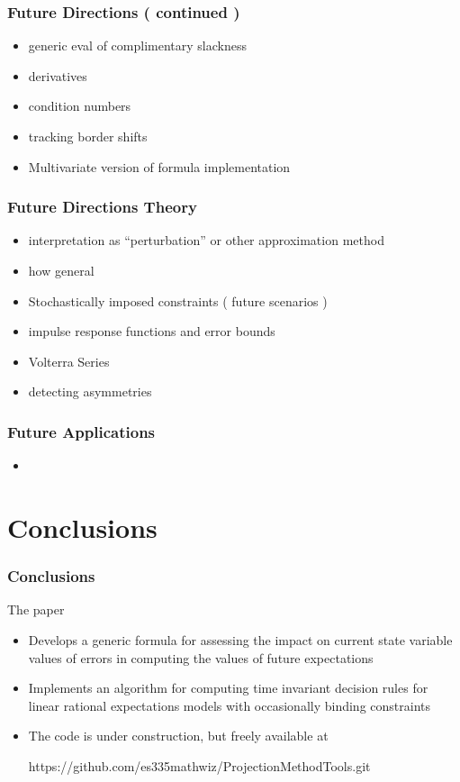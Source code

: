 \documentclass{beamer}
\begin{document}
   \begin{frame}
     \frametitle{Future Directions ( continued )}
     \begin{itemize}
 \item generic eval of complimentary slackness
 \item derivatives
 \item condition numbers
 \item tracking border shifts
 \item Multivariate version of formula implementation
     \end{itemize}
   \end{frame}

   \begin{frame}
     \frametitle{Future Directions Theory}
     \begin{itemize}
 \item interpretation as ``perturbation'' or other approximation method
 \item how general
 \item Stochastically imposed constraints ( future scenarios )
 \item impulse response functions and error bounds
 \item Volterra Series
 \item detecting asymmetries
     \end{itemize}
   \end{frame}
   \begin{frame}
   \frametitle{Future Applications}
     \begin{itemize}
 \item
     \end{itemize}
   \end{frame}




    \section{Conclusions}

  \begin{frame}
    \frametitle{Conclusions}

The paper 

    \begin{itemize}
\item Develops a generic formula  for assessing the impact on current state variable values of errors in computing the values of future expectations
    \item Implements an algorithm for computing time invariant 
decision rules for linear rational expectations models with occasionally binding constraints
\item The code is under construction, but freely available at 

https://github.com/es335mathwiz/ProjectionMethodTools.git
    \end{itemize}
  \end{frame}
\end{document}
